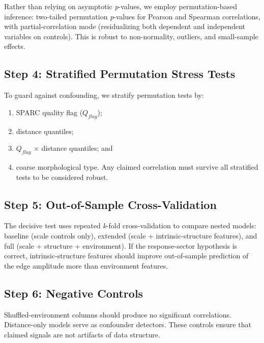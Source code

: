 \documentclass[11pt]{article}
\begin{document}
Rather than relying on asymptotic \emph{p}-values, we employ permutation-based inference: two-tailed permutation \emph{p}-values for Pearson and Spearman correlations, with partial-correlation mode (residualizing both dependent and independent variables on controls). This is robust to non-normality, outliers, and small-sample effects.

\subsection{Step 4: Stratified Permutation Stress Tests}\label{step-4-stratified-permutation-stress-tests}

To guard against confounding, we stratify permutation tests by:

\begin{enumerate}
\def\labelenumi{(\roman{enumi})}
\item
  SPARC quality flag (\(Q_{flag}\));
\item
  distance quantiles;
\item
  \(Q_{flag}\) × distance quantiles; and
\item
  coarse morphological type. Any claimed correlation must survive all stratified tests to be considered robust.
\end{enumerate}

\subsection{Step 5: Out-of-Sample Cross-Validation}\label{step-5-out-of-sample-cross-validation}

The decisive test uses repeated \emph{k}-fold cross-validation to compare nested models: baseline (scale controls only), extended (scale + intrinsic-structure features), and full (scale + structure + environment). If the response-sector hypothesis is correct, intrinsic-structure features should improve out-of-sample prediction of the edge amplitude more than environment features.

\subsection{Step 6: Negative Controls}\label{step-6-negative-controls}

Shuffled-environment columns should produce no significant correlations. Distance-only models serve as confounder detectors. These controls ensure that claimed signals are not artifacts of data structure.
\end{document}
